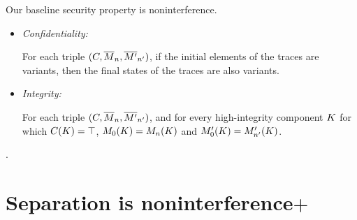 \documentclass[conference]{IEEEtran}
\begin{document}
Our baseline security property is noninterference.
\begin{itemize}
\item {\em Confidentiality:}

  For each triple $(C, \overline{M}_n, \overline{M'}_{n'})$, if
  the initial elements of the traces are variants, then the final
  states of the traces are also variants.  

\item {\em Integrity: }

  For each triple $(C, \overline{M}_n, \overline{M'}_{n'})$,
  and for every high-integrity component $K$ for which
  $C(K) = \top$, $M_0(K) = M_n(K)$
  and $M'_0(K) = M'_{n'}(K)$.
\end{itemize}
.
%
%


\section{Separation is noninterference$+$}
\end{document}
